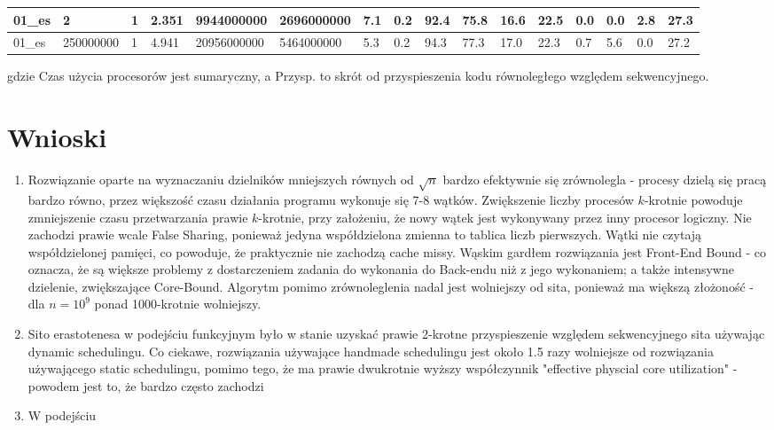 \documentclass[12pt]{article}
\begin{document}
\begin{flushleft}
\begin{landscape}
\begin{tabular}{| l | l | l | l | l | l | l | l | l | l | l | l | l | l | l | l |}
		01\_es & 2 & 1 & 2.351 & 9944000000 & 2696000000 & 7.1 & 0.2 & 92.4 & 75.8 & 16.6 & 22.5 & 0.0 & 0.0 & 2.8 & 27.3 \\ \hline
		01\_es & 250000000 & 1 & 4.941 & 20956000000 & 5464000000 & 5.3 & 0.2 & 94.3 & 77.3 & 17.0 & 22.3 & 0.7 & 5.6 & 0.0 & 27.2 \\ \hline
	\end{tabular}
\end{landscape}
gdzie Czas użycia procesorów jest sumaryczny, a Przysp. to skrót od przyspieszenia kodu równoległego względem sekwencyjnego.
	
\end{flushleft}

\section{Wnioski}
\begin{enumerate}
	\item Rozwiązanie oparte na wyznaczaniu dzielników mniejszych równych od \(\sqrt{n}\) bardzo efektywnie się zrównolegla - procesy dzielą się pracą bardzo równo, przez większość czasu działania programu wykonuje się 7-8 wątków. Zwiększenie liczby procesów \(k\)-krotnie powoduje zmniejszenie czasu przetwarzania prawie \(k\)-krotnie, przy założeniu, że nowy wątek jest wykonywany przez inny procesor logiczny. Nie zachodzi prawie wcale False Sharing, ponieważ jedyna współdzielona zmienna to tablica liczb pierwszych. Wątki nie czytają współdzielonej pamięci, co powoduje, że praktycznie nie zachodzą cache missy. Wąskim gardłem rozwiązania jest Front-End Bound - co oznacza, że są większe problemy z dostarczeniem zadania do wykonania do Back-endu niż z jego wykonaniem; a także intensywne dzielenie, zwiększające Core-Bound. Algorytm pomimo zrównoleglenia nadal jest wolniejszy od sita, ponieważ ma większą złożoność - dla \(n=10^9\) ponad 1000-krotnie wolniejszy.
	\item Sito erastotenesa w podejściu funkcyjnym było w stanie uzyskać prawie 2-krotne przyspieszenie względem sekwencyjnego sita używając dynamic schedulingu. Co ciekawe, rozwiązania używające handmade schedulingu jest około 1.5 razy wolniejsze od rozwiązania używającego static schedulingu, pomimo tego, że ma prawie dwukrotnie wyższy współczynnik "effective physcial core utilization" - powodem jest to, że bardzo często zachodzi
	
	\item W podejściu 
\end{enumerate}
\end{document}
